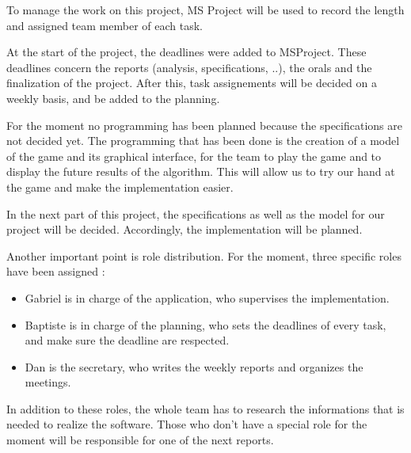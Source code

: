 \label{last last part}
To manage the work on this project, MS Project will be used to record the length and assigned team member of each task.
\newline

At the start of the project, the deadlines were added to MSProject. These deadlines concern the reports (analysis, specifications, ..), the orals and the finalization of the project. After this, task assignements will be decided on a weekly basis, and be added to the planning.
\newline

For the moment no programming has been planned because the specifications are not decided yet. The programming that has been done is the creation of a model of the game and its graphical interface, for the team to play the game and to display the future results of the algorithm. This will allow us to try our hand at the game and make the implementation easier.
\newline

In the next part of this project, the specifications as well as the model for our project will be decided. Accordingly, the implementation will be planned.
\newline

Another important point is role distribution. For the moment, three specific roles have been assigned : 
\begin{itemize}
\item Gabriel is in charge of the application, who supervises the implementation.
\item Baptiste is in charge of the planning, who sets the deadlines of every task, and make sure the deadline are respected.
\item Dan is the secretary, who writes the weekly reports and organizes the meetings.
\end{itemize}
In addition to these roles, the whole team has to research the informations that is needed to realize the software. Those who don't have a special role for the moment will be responsible for one of the next reports.